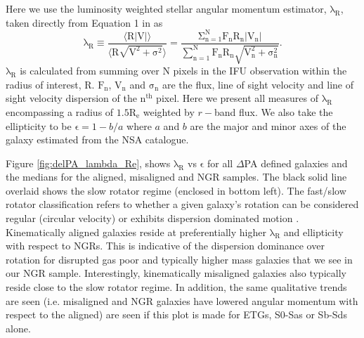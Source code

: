 Here we use the luminosity weighted stellar angular momentum estimator, $\mathrm{\lambda_R}$, taken directly from Equation 1 in \citet{emsellem2007} as
\begin{equation} \label{eq:lambda_R}
\mathrm{\lambda_{R} \equiv \frac{\langle R | V | \rangle}{ \langle R \sqrt{ V^{2} + \sigma^{2} } \rangle } = \frac{ \Sigma_{ n = 1 }^{ N } F_{ n } R_ { n } \left| V_{ n } \right| }{ \sum_{ n = 1 }^{ N } F_{n} R_{ n } \sqrt{ V_{ n }^{ 2 } + \sigma_{ n }^{ 2 } } }.}
\end{equation}
$\mathrm{\lambda_R}$ is calculated from summing over N pixels in the IFU observation within the radius of interest, $\mathrm{R}$. $\mathrm{F_{n}}$, $\mathrm{V_{n}}$ and $\mathrm{\sigma_{n}}$ are the flux, line of sight velocity and line of sight velocity dispersion of the $\mathrm{n^{th}}$ pixel. Here we present all measures of $\mathrm{\lambda_R}$ encompassing a radius of $\mathrm{1.5R_e}$ weighted by $r-$band flux. We also take the ellipticity to be $\mathrm{\epsilon} = 1 - b/a$ where $a$ and $b$ are the major and minor axes of the galaxy estimated from the NSA catalogue.

Figure \ref{fig:delPA_lambda_Re}, shows $\mathrm{\lambda_R}$ vs $\mathrm{\epsilon}$ for all $\Delta$PA defined galaxies and the medians for the aligned, misaligned and NGR samples. The black solid line overlaid shows the slow rotator regime (enclosed in bottom left). The fast/slow rotator classification refers to whether a given galaxy's rotation can be considered regular (circular velocity) or exhibits dispersion dominated motion \citep[][]{emsellem2007}. Kinematically aligned galaxies reside at preferentially higher $\mathrm{\lambda_R}$ and ellipticity with respect to NGRs. This is indicative of the dispersion dominance over rotation for disrupted gas poor and typically higher mass galaxies that we see in our NGR sample. Interestingly, kinematically misaligned galaxies also typically reside close to the slow rotator regime. In addition, the same qualitative trends are seen (i.e. misaligned and NGR galaxies have lowered angular momentum with respect to the aligned) are seen if this plot is made for ETGs, S0-Sas or Sb-Sds alone. 

